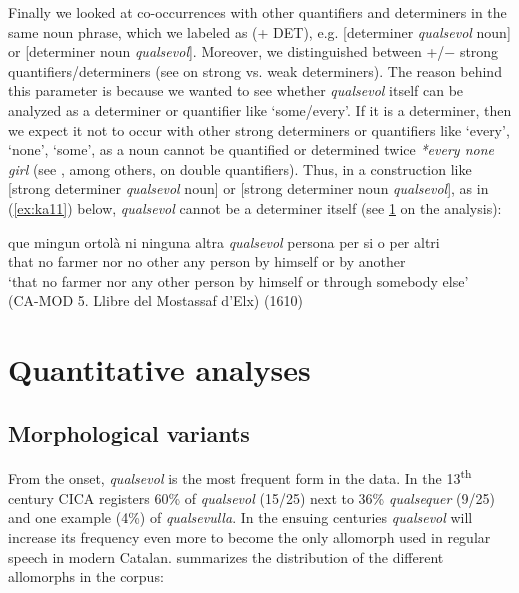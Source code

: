 \documentclass[output=paper,colorlinks,citecolor=brown]{langscibook}
\begin{document}
Finally we looked at co-occurrences with other quantifiers and determiners in the same noun phrase, which we labeled as (+ DET), e.g. [determiner \textit{qualsevol} noun] or [determiner noun \textit{qualsevol}]. Moreover, we distinguished between +/$-$ strong quantifiers/determiners (see \cite{Zamparelli2000} on strong vs. weak determiners). The reason behind this parameter is because we wanted to see whether \textit{qualsevol} itself can be analyzed as a determiner or quantifier like ‘some/every’. If it is a determiner, then we expect it not to occur with other strong determiners or quantifiers like ‘every’, ‘none’, ‘some’, as a noun cannot be quantified or determined twice \textit{*every none girl} (see \cite{EtxeberriaGiannakidou2014}, among others, on double quantifiers). Thus, in a construction like [strong determiner \textit{qualsevol} noun] or [strong determiner noun \textit{qualsevol}], as in (\ref{ex:ka11}) below, \textit{qualsevol} cannot be a determiner itself (see \ref{sec:kea5} on the analysis):

\ea \label{ex:ka11}
\gll que mingun ortolà ni ninguna altra \textit{qualsevol} persona per si o per altri\\
    that no farmer nor no other any person by himself or by another\\
    \glt ‘that no farmer nor any other person by himself or through somebody else’\\
    (CA-MOD 5. Llibre del Mostassaf d'Elx) (1610)
\z


\section{Quantitative analyses}\label{sec:kea5}
\subsection{Morphological variants}\label{sec:kea5.1}

From the onset, \textit{qualsevol} is the most frequent form in the data. In the 13\textsuperscript{th} century CICA registers 60\% of \textit{qualsevol} (15/25) next to 36\% \textit{qualsequer} (9/25) and one example (4\%) of \textit{qualsevulla}. In the ensuing centuries \textit{qualsevol} will increase its frequency even more to become the only allomorph used in regular speech in modern Catalan.  summarizes the distribution of the different allomorphs in the corpus:
\end{document}
